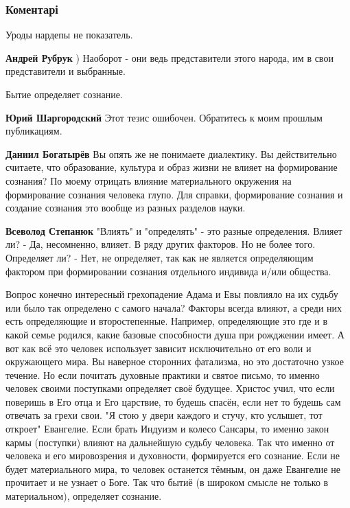  
 
 
 
 
\subsubsection{Коментарі}

\begin{itemize} %
Уроды нардепы не показатель.

\textbf{Андрей Рубрук} ) Наоборот - они ведь представители этого народа, им в свои представители и выбранные.

Бытие определяет сознание.

\begin{itemize} %
\textbf{Юрий Шаргородский} Этот тезис ошибочен. Обратитесь к моим прошлым публикациям.

\textbf{Даниил Богатырёв} Вы опять же не понимаете диалектику. Вы действительно считаете, что образование, культура и образ жизни не влияет на формирование сознания? По моему отрицать влияние материального окружения на формирование сознания человека глупо. Для справки, формирование сознания и создание сознания это вообще из разных разделов науки.

\textbf{Всеволод Степанюк} "Влиять" и "определять" - это разные определения. Влияет ли? - Да, несомненно, влияет. В ряду других факторов. Но не более того. Определяет ли? - Нет, не определяет, так как не является определяющим фактором при формировании сознания отдельного индивида и/или общества.


Вопрос конечно интересный грехопадение Адама и Евы повлияло на их судьбу или
было так определено с самого начала? Факторы всегда влияют, а среди них есть
определяющие и второстепенные. Например, определяющие это где и в какой семье
родился, какие базовые способности душа при рожджении имеет. А вот как всё это
человек использует зависит исключительно от его воли и окружающего мира. Вы
наверное сторонних фатализма, но это достаточно узкое течение. Но если почитать
духовные практики и святое письмо, то именно человек своими поступками
определяет своё будущее. Христос учил, что если поверишь в Его отца и Его
царствие, то будешь спасён, если нет то будешь сам отвечать за грехи свои. "Я
стою у двери каждого и стучу, кто услышет, тот откроет" Евангелие. Если брать
Индуизм и колесо Сансары, то именно закон кармы (поступки) влияют на дальнейшую
судьбу человека. Так что именно от человека и его мировозрения и духовности,
формируется его сознание. Если не будет материального мира, то человек
останется тёмным, он даже Евангелие не прочитает и не узнает о Боге. Так что
бытиё (в широком смысле не только в материальном), определяет сознание.


\end{itemize}
\end{itemize}

